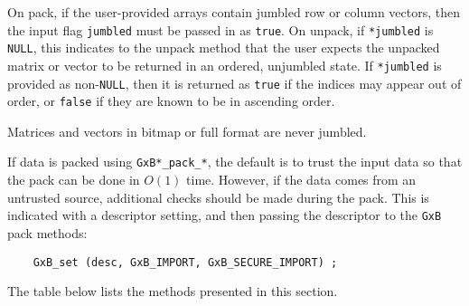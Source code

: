\documentclass[12pt]{article}
\begin{document}
On pack, if the user-provided arrays contain jumbled row or column vectors,
then the input flag \verb'jumbled' must be passed in as \verb'true'.  On
unpack, if \verb'*jumbled' is \verb'NULL', this indicates to the unpack method
that the user expects the unpacked matrix or vector to be returned in an
ordered, unjumbled state.  If \verb'*jumbled' is provided as non-\verb'NULL',
then it is returned as \verb'true' if the indices may appear out of order, or
\verb'false' if they are known to be in ascending order.

Matrices and vectors in bitmap or full format are never jumbled.

If data is packed using
\verb'GxB*_pack_*', the default is to trust the input data so that the
pack can be done in $O(1)$ time.  However, if the data comes from an
untrusted source, additional checks should be made during the pack.  This is
indicated with a descriptor setting, and then passing the descriptor
to the \verb'GxB' pack methods:

    {\footnotesize
    \begin{verbatim}
    GxB_set (desc, GxB_IMPORT, GxB_SECURE_IMPORT) ; \end{verbatim}}

The table below lists the methods presented in this section.
\end{document}
